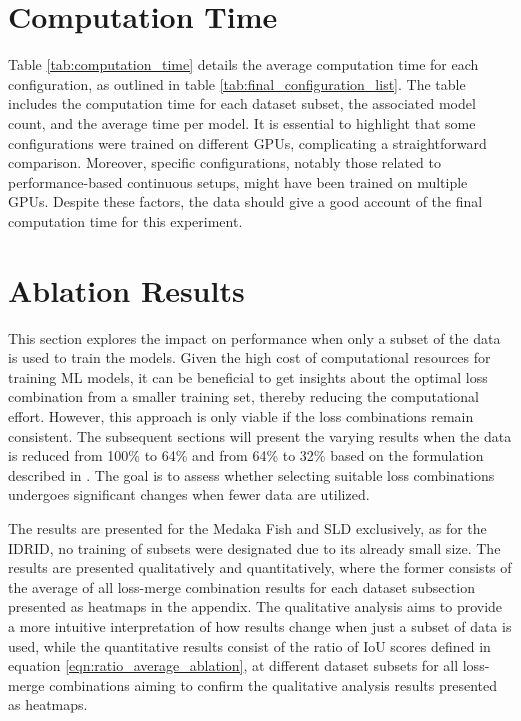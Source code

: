 \section{Computation Time}
\label{sec:computation_time}

Table \ref{tab:computation_time} details the average computation time for each configuration, as outlined in table \ref{tab:final_configuration_list}. The table includes the computation time for each dataset subset, the associated model count, and the average time per model. It is essential to highlight that some configurations were trained on different GPUs, complicating a straightforward comparison. Moreover, specific configurations, notably those related to performance-based continuous setups, might have been trained on multiple GPUs. Despite these factors, the data should give a good account of the final computation time for this experiment.
\section{Ablation Results}
\label{sec:ablation_results}
This section explores the impact on performance when only a subset of the data is used to train the models. Given the high cost of computational resources for training \ac{ML} models, it can be beneficial to get insights about the optimal loss combination from a smaller training set, thereby reducing the computational effort. However, this approach is only viable if the loss combinations remain consistent. The subsequent sections will present the varying results when the data is reduced from 100\% to 64\% and from 64\% to 32\% based on the formulation described in . The goal is to assess whether selecting suitable loss combinations undergoes significant changes when fewer data are utilized.

The results are presented for the Medaka Fish and \acf{SLD} exclusively, as for the \ac{IDRID}, no training of subsets were designated due to its already small size. The results are presented qualitatively and quantitatively, where the former consists of the average of all loss-merge combination results for each dataset subsection presented as heatmaps in the appendix. The qualitative analysis aims to provide a more intuitive interpretation of how results change when just a subset of data is used, while the quantitative results consist of the ratio of \ac{IoU} scores defined in equation \ref{eqn:ratio_average_ablation}, at different dataset subsets for all loss-merge combinations aiming to confirm the qualitative analysis results presented as heatmaps.

